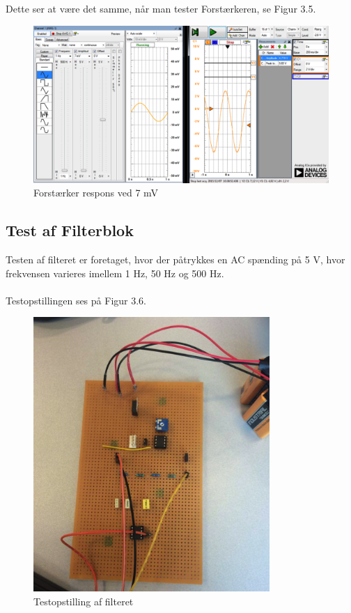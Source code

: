 Dette ser at være det samme, når man tester Forstærkeren, se Figur 3.5. 

\begin{figure}[H]
	\centering
	\includegraphics[width=1\textwidth]{Figurer/Snip20151207_37}
	\caption{Forstærker respons ved 7 mV}
\end{figure}


\subsection{Test af Filterblok}
Testen af filteret er foretaget, hvor der påtrykkes en AC spænding på 5 V, hvor frekvensen varieres imellem 1 Hz, 50 Hz og 500 Hz. \\ \\

Testopstillingen ses på Figur 3.6.  

\begin{figure}[H]
	\centering
	\includegraphics[width=0.8\textwidth]{Figurer/Snip20151207_38}
	\caption{Testopstilling af filteret}
	\label{fig:Filter}
\end{figure}

